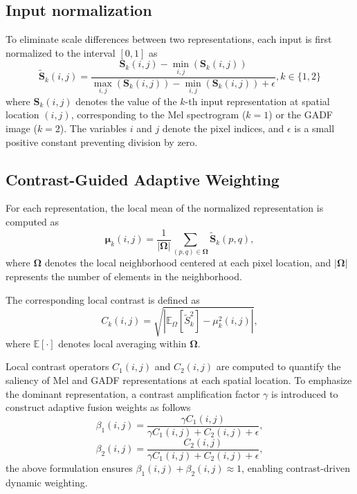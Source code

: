\documentclass[journal]{IEEEtran}
\begin{document}
\subsection{Input normalization}
To eliminate scale differences between two representations, each input is first normalized to the interval $[0,1]$ as
\begin{equation}
	\boldsymbol{\tilde{S}}_k(i,j) = \frac{\boldsymbol{S}_k(i,j) - \min\limits_{i,j} (\boldsymbol{S}_k(i,j))}{\max\limits_{i,j} (\boldsymbol{S}_k(i,j)) - \min\limits_{i,j} (\boldsymbol{S}_k(i,j)) + \epsilon}, k\in\{1,2\}
	\label{eq:normalization}
\end{equation}
where $\boldsymbol{S}_k(i,j)$ denotes the value of the $k$-th input representation at spatial location $(i,j)$, corresponding to the Mel spectrogram ($k=1$) or the GADF image ($k=2$). The variables $i$ and $j$ denote the pixel indices, and $\epsilon$ is a small positive constant preventing division by zero.

\subsection{Contrast-Guided Adaptive Weighting}
For each representation, the local mean of the normalized representation is computed as
\begin{equation}
	\boldsymbol{\mu}_k(i,j) = \frac{1}{|\boldsymbol{\Omega}|}
	\sum_{(p,q)\in \boldsymbol{\Omega}} \boldsymbol{\tilde{S}}_k(p,q),
	\label{eq:local_mean}
\end{equation}
where $\boldsymbol{\Omega}$ denotes the local neighborhood centered at each pixel location, and $|\boldsymbol{\Omega}|$ represents the number of elements in the neighborhood.

The corresponding local contrast is defined as
\begin{equation}
	C_k(i,j) = \sqrt{ \left| \mathbb{E}_\Omega \left[ \tilde{S}_k^2 \right] - \mu_k^2(i,j) \right| },
	\label{eq:eq:local_contrast}
\end{equation}
where $\mathbb{E}[\cdot]$ denotes local averaging within $\boldsymbol{\Omega}$.

Local contrast operators $C_1(i,j)$ and $C_2(i,j)$ are computed to quantify the saliency of Mel and GADF representations at each spatial location. To emphasize the dominant representation, a contrast amplification factor $\gamma$ is introduced to construct adaptive fusion weights as follows
\begin{equation}
	\beta_1(i,j) = 
	\frac{\gamma C_1(i,j)}
	{\gamma C_1(i,j) + C_2(i,j) + \epsilon},
	\label{eq:beta1}
\end{equation}
\begin{equation}
	\beta_2(i,j) = 
	\frac{C_2(i,j)}
	{\gamma C_1(i,j) + C_2(i,j) + \epsilon},
	\label{eq:beta2}
\end{equation}
the above formulation ensures $\beta_1(i,j) + \beta_2(i,j) \approx 1$, enabling contrast-driven dynamic weighting.
\end{document}
